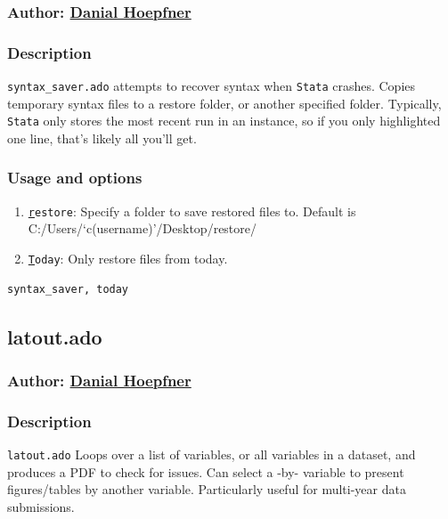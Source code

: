 {\subsubsection{Author: \href{mailto:dhoepfner@gibsonconsult.com}{Danial Hoepfner}}
\subsubsection{Description}
\texttt{syntax\_saver.ado} attempts to recover syntax when \texttt{Stata} crashes. Copies temporary syntax files to a restore folder, or another specified folder. Typically, \texttt{Stata} only stores the most recent run in an instance, so if you only highlighted one line, that's likely all you'll get.
\subsubsection{Usage and options}
\begin{enumerate}
\item \texttt{\underline{r}estore}: Specify a folder to save restored files to. Default is C:/Users/`c(username)'/Desktop/restore/
\item \texttt{\underline{T}oday}: Only restore files from today.
\end{enumerate}

\begin{lstlisting}
syntax_saver, today
\end{lstlisting}


\subsection{latout.ado}
\subsubsection{Author: \href{mailto:dhoepfner@gibsonconsult.com}{Danial Hoepfner}}
\subsubsection{Description}
\texttt{latout.ado} Loops over a list of variables, or all variables in a dataset, and produces a PDF to check for issues. Can select a -by- variable to present figures/tables by another variable. Particularly useful for multi-year data submissions.
}
